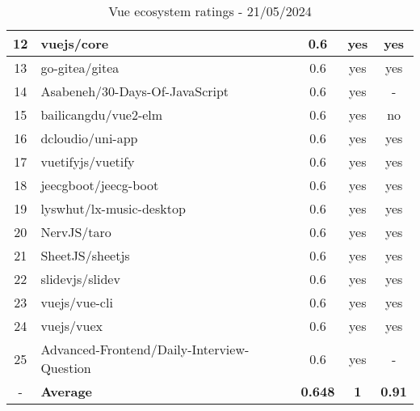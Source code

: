 \begin{table}[H]
{\begin{tabular}{|c|l|c|c|c|}
            12 & vuejs/core                                 & 0.6                & yes                        & yes                \\ \hline
            13 & go-gitea/gitea                             & 0.6                & yes                        & yes                \\ \hline
            14 & Asabeneh/30-Days-Of-JavaScript             & 0.6                & yes                        & -                  \\ \hline
            15 & bailicangdu/vue2-elm                       & 0.6                & yes                        & no                 \\ \hline
            16 & dcloudio/uni-app                           & 0.6                & yes                        & yes                \\ \hline
            17 & vuetifyjs/vuetify                          & 0.6                & yes                        & yes                \\ \hline
            18 & jeecgboot/jeecg-boot                       & 0.6                & yes                        & yes                \\ \hline
            19 & lyswhut/lx-music-desktop                   & 0.6                & yes                        & yes                \\ \hline
            20 & NervJS/taro                                & 0.6                & yes                        & yes                \\ \hline
            21 & SheetJS/sheetjs                            & 0.6                & yes                        & yes                \\ \hline
            22 & slidevjs/slidev                            & 0.6                & yes                        & yes                \\ \hline
            23 & vuejs/vue-cli                              & 0.6                & yes                        & yes                \\ \hline
            24 & vuejs/vuex                                 & 0.6                & yes                        & yes                \\ \hline
            25 & Advanced-Frontend/Daily-Interview-Question & 0.6                & yes                        & -                  \\ \hline
            -  & \textbf{Average}                           & \textbf{0.648}     & \textbf{1}                 & \textbf{0.91}      \\ \hline
        \end{tabular}
    }
    \caption{Vue ecosystem ratings - 21/05/2024}
    \label{tab:metrics:vue:ratings}
\end{table}


